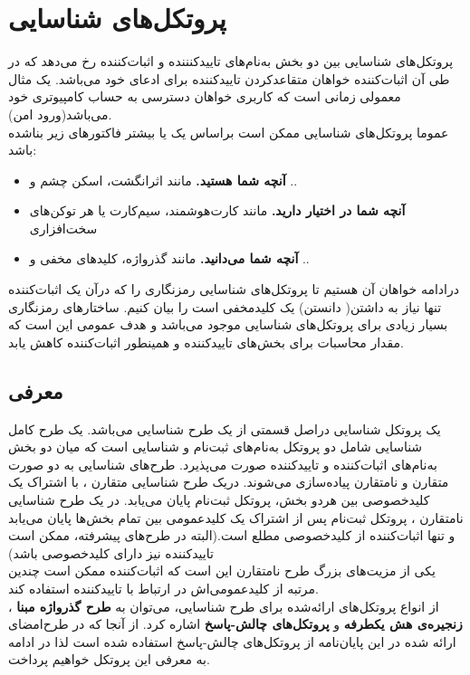 \section{پروتکل‌های شناسایی}\label{identification}
پروتکل‌های شناسایی
بین دو بخش به‌نام‌های تاییدکنننده و اثبات‌کننده رخ می‌دهد که در طی آن اثبات‌کننده خواهان متقاعدکردن تاییدکننده برای ادعای خود می‌باشد. یک مثال معمولی زمانی است که کاربری خواهان دسترسی به حساب کامپیوتری خود می‌باشد(ورود امن).
\\
عموما پروتکل‌های شناسایی ممکن است براساس یک یا بیشتر فاکتورهای زیر بناشده باشد:
\begin{itemize}
\item {
\textbf{آنچه شما هستید.}
 مانند اثرانگشت، اسکن چشم و ..
}
\item {
\textbf{آنچه شما در اختیار دارید.}
مانند کارت‌هوشمند، سیم‌کارت یا هر توکن‌های سخت‌افزاری 
}

\item {
\textbf{آنچه شما می‌دانید. }
مانند گذرواژه، کلیدهای مخفی و ..
}
\end{itemize}
درادامه خواهان آن هستیم تا پروتکل‌های شناسایی رمزنگاری را که درآن یک اثبات‌کننده تنها نیاز به داشتن( دانستن) یک کلیدمخفی است را بیان کنیم. ساختارهای رمزنگاری بسیار زیادی برای پروتکل‌های شناسایی موجود می‌باشد  و هدف عمومی این است که مقدار محاسبات برای بخش‌های تاییدکننده و همینطور اثبات‌کننده کاهش یابد.
\iffalse
حدوده‌ی امنیت از نسبتا ضعیف پروتکل‌های گذرواژه مبنا تا قوی برای پروتکل‌های اثبات‌دانش‌صفر گسترده می‌باشد.

\\
لازم به ذکر است که مشکلات مربوط به پروتکل‌های شناسایی، ویژه‌ی احراهویت متن (امضاهای دیجیتال) و همچنین مبادله کلید تاییدشده می‌باشد.
\fi

\subsection{معرفی}\label{identification_define}

یک پروتکل شناسایی دراصل قسمتی از یک طرح شناسایی می‌باشد.
یک طرح  کامل شناسایی شامل دو پروتکل به‌نام‌های ثبت‌نام و شناسایی است که میان دو بخش به‌نام‌های اثبات‌کننده و تاییدکننده صورت می‌پذیرد.
طرح‌های شناسایی به دو صورت متقارن و نامتقارن پیاده‌سازی می‌شوند.
دریک طرح شناسایی متقارن ، با اشتراک یک کلیدخصوصی بین هردو بخش، پروتکل ثبت‌نام پایان می‌یابد.
در یک طرح شناسایی نامتقارن ، پروتکل  ثبت‌نام پس از اشتراک یک کلیدعمومی بین  تمام بخش‌ها پایان می‌یابد و تنها اثبات‌کننده از کلیدخصوصی مطلع است.(البته در طرح‌های پیشرفته،  ممکن است تاییدکننده نیز دارای کلیدخصوصی باشد)
\\
یکی از مزیت‌های بزرگ طرح نامتقارن این است که اثبات‌کننده ممکن است چندین مرتبه از کلیدعمومی‌اش در ارتباط با تاییدکننده استفاده کند.
\\
از انواع پروتکل‌های ارائه‌شده برای طرح شناسایی، می‌توان به 
\textbf{طرح گذرواژه مبنا}
، 
\textbf{زنجیره‌ی هش یکطرفه}
 و 
\textbf{پروتکل‌های چالش-پاسخ} 
  اشاره کرد.
از آنجا که در طرح‌امضای ارائه شده در این پایان‌نامه از پروتکل‌های چالش-پاسخ استفاده شده است لذا در ادامه به معرفی این پروتکل خواهیم پرداخت.

